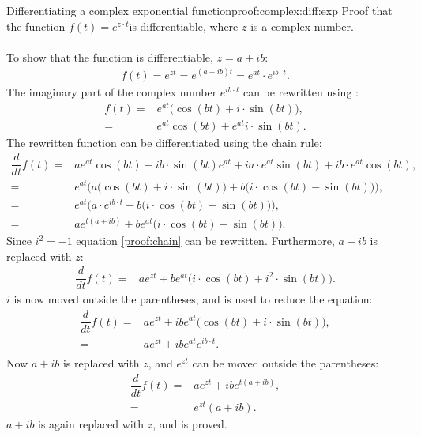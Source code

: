 \begin{prof}{Differentiating a complex exponential function}{proof:complex:diff:exp}
Proof that the function $f(t)=e^{z\cdot t}$is differentiable, where $z$ is a complex number.
\\ \\
To show that the function is differentiable, $z=a+ ib$:
\begin{align*}
	f(t) = e^{zt}= e^{(a+ib)t}= e^{at} \cdot e^{ib\cdot t}.
\end{align*}
The imaginary part of the complex number $e^{ib\cdot t}$ can be rewritten using :
\begin{align*}
	f(t) =& e^{at}\big(\cos(bt)+i \cdot \sin(bt)\big), \\
		 =& e^{at}\cos(bt) + e^{at} i \cdot \sin(bt).
\end{align*}
The rewritten function can be differentiated using the chain rule:
\begin{align}
	\dfrac{d}{dt}f(t) =& ae^{at}\cos(bt) -ib \cdot \sin(bt)e^{at} + ia \cdot e^{at}\sin(bt) + ib \cdot e^{at}\cos(bt), \nonumber \\
	=& e^{at} \bigg( a\big(\cos(bt) + i \cdot \sin(bt)\big) + b\big(i \cdot \cos(bt) - \sin(bt)\big) \bigg), \nonumber \\
	=& e^{at}\bigg(a \cdot e^{ib \cdot t}+b\big(i \cdot \cos(bt) - \sin(bt)\big)\bigg), \nonumber \\
	=& a e^{t(a+ib)} + b e^{at}\big(i \cdot \cos(bt) - \sin(bt)\big). \label{proof:chain}
\end{align}
Since $i^2 = -1$ equation \eqref{proof:chain} can be rewritten. Furthermore, $a+ib$ is replaced with $z$:
\begin{align*}
	\dfrac{d}{dt}f(t) =& a e^{zt} + b e^{at}\big(i \cdot \cos(bt) + i^2 \cdot \sin(bt)\big).
\end{align*}
$i$ is now moved outside the parentheses, and  is used to reduce the equation:
\begin{align*}
	\dfrac{d}{dt}f(t) =&  a e^{zt} + ib e^{at}\big(\cos(bt) + i \cdot \sin(bt)\big), \\
	=&  a e^{zt} + ib e^{at}e^{ib \cdot t}. \\
\end{align*}
Now $a+ib$ is replaced with $z$, and $e^{zt}$ can be moved outside the parentheses:
\begin{align*}
	\dfrac{d}{dt}f(t) =&  a e^{zt} + ib e^{t(a+ib)}, \\
	=&  e^{zt}(a+ib).
\end{align*}
$a+ib$ is again replaced with $z$, and  is proved.
\end{prof}
